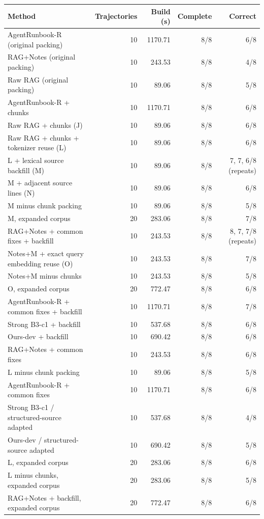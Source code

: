 \begin{tabular}{lrrrr}
\hline
Method & Trajectories & Build (s) & Complete & Correct \\
\hline
AgentRunbook-R (original packing) & 10 & 1170.71 & 8/8 & 6/8 \\
RAG+Notes (original packing) & 10 & 243.53 & 8/8 & 4/8 \\
Raw RAG (original packing) & 10 & 89.06 & 8/8 & 5/8 \\
AgentRunbook-R + chunks & 10 & 1170.71 & 8/8 & 6/8 \\
Raw RAG + chunks (J) & 10 & 89.06 & 8/8 & 6/8 \\
Raw RAG + chunks + tokenizer reuse (L) & 10 & 89.06 & 8/8 & 6/8 \\
L + lexical source backfill (M) & 10 & 89.06 & 8/8 & 7, 7, 6/8 (repeats) \\
M + adjacent source lines (N) & 10 & 89.06 & 8/8 & 6/8 \\
M minus chunk packing & 10 & 89.06 & 8/8 & 5/8 \\
M, expanded corpus & 20 & 283.06 & 8/8 & 7/8 \\
RAG+Notes + common fixes + backfill & 10 & 243.53 & 8/8 & 8, 7, 7/8 (repeats) \\
Notes+M + exact query embedding reuse (O) & 10 & 243.53 & 8/8 & 7/8 \\
Notes+M minus chunks & 10 & 243.53 & 8/8 & 5/8 \\
O, expanded corpus & 20 & 772.47 & 8/8 & 6/8 \\
AgentRunbook-R + common fixes + backfill & 10 & 1170.71 & 8/8 & 7/8 \\
Strong B3-c1 + backfill & 10 & 537.68 & 8/8 & 6/8 \\
Ours-dev + backfill & 10 & 690.42 & 8/8 & 6/8 \\
RAG+Notes + common fixes & 10 & 243.53 & 8/8 & 6/8 \\
L minus chunk packing & 10 & 89.06 & 8/8 & 5/8 \\
AgentRunbook-R + common fixes & 10 & 1170.71 & 8/8 & 6/8 \\
Strong B3-c1 / structured-source adapted & 10 & 537.68 & 8/8 & 4/8 \\
Ours-dev / structured-source adapted & 10 & 690.42 & 8/8 & 5/8 \\
L, expanded corpus & 20 & 283.06 & 8/8 & 6/8 \\
L minus chunks, expanded corpus & 20 & 283.06 & 8/8 & 5/8 \\
RAG+Notes + backfill, expanded corpus & 20 & 772.47 & 8/8 & 6/8 \\
\hline
\end{tabular}
